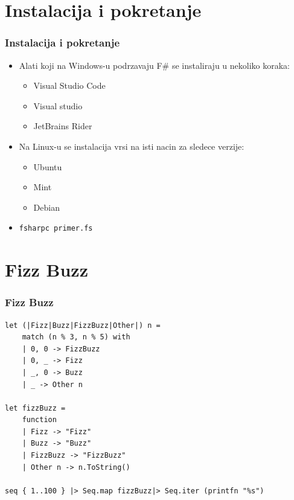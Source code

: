\documentclass{beamer}
\begin{document}
\section{Instalacija i pokretanje}
\begin{frame}[fragile]
\frametitle{Instalacija i pokretanje}

\begin{itemize}
\item Alati koji na Windows-u podrzavaju F\# se instaliraju u nekoliko koraka:
	\begin{itemize}
	\item Visual Studio Code
	\item Visual studio
	\item JetBrains Rider
	\end{itemize}
\item Na Linux-u se instalacija vrsi na isti nacin za sledece verzije:
	\begin{itemize}
	\item Ubuntu
	\item Mint
	\item Debian
	\end{itemize}
	\item \begin{lstlisting}
fsharpc primer.fs
\end{lstlisting}
\end{itemize}
\end{frame}

\section{Fizz Buzz}
\begin{frame}[fragile]
\frametitle{Fizz Buzz}

\begin{lstlisting}
let (|Fizz|Buzz|FizzBuzz|Other|) n =
    match (n % 3, n % 5) with
    | 0, 0 -> FizzBuzz
    | 0, _ -> Fizz
    | _, 0 -> Buzz
    | _ -> Other n

let fizzBuzz =
    function
    | Fizz -> "Fizz"
    | Buzz -> "Buzz"
    | FizzBuzz -> "FizzBuzz"
    | Other n -> n.ToString()

seq { 1..100 } |> Seq.map fizzBuzz|> Seq.iter (printfn "%s")
\end{lstlisting}

\end{frame}
\end{document}
